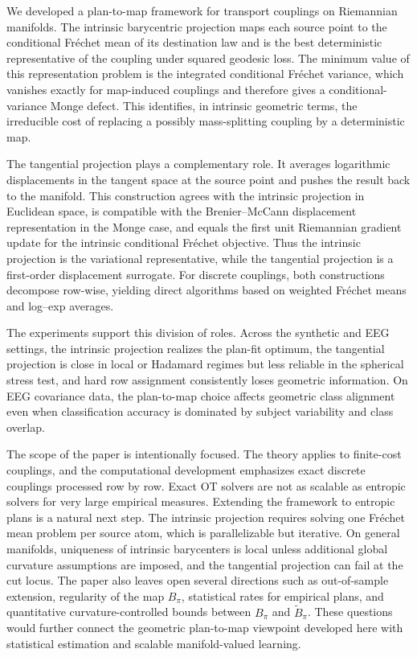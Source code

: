 \documentclass[10pt]{article} %
\theoremstyle{definition}
\providecommand{\1}{\mathbf{1}}
\begin{document}
We developed a plan-to-map framework for transport couplings on Riemannian
manifolds. The intrinsic barycentric projection maps each source point to the
conditional Fr\'echet mean of its destination law and is the best deterministic
representative of the coupling under squared geodesic loss. The minimum value
of this representation problem is the integrated conditional Fr\'echet
variance, which vanishes exactly for map-induced couplings and therefore gives
a conditional-variance Monge defect. This identifies, in intrinsic geometric
terms, the irreducible cost of replacing a possibly mass-splitting coupling by
a deterministic map.

The tangential projection plays a complementary role. It averages logarithmic
displacements in the tangent space at the source point and pushes the result
back to the manifold. This construction agrees with the intrinsic projection in
Euclidean space, is compatible with the Brenier--McCann displacement
representation in the Monge case, and equals the first unit Riemannian gradient
update for the intrinsic conditional Fr\'echet objective. Thus the intrinsic
projection is the variational representative, while the tangential
projection is a first-order displacement surrogate. For discrete couplings, both
constructions decompose row-wise, yielding direct algorithms based on weighted
Fr\'echet means and log--exp averages.

The experiments support this division of roles. Across the synthetic and EEG
settings, the intrinsic projection realizes the plan-fit optimum, the tangential
projection is close in local or Hadamard regimes but less reliable in the
spherical stress test, and hard row assignment consistently loses geometric
information. On EEG covariance data, the plan-to-map choice affects geometric
class alignment even when classification accuracy is dominated by subject
variability and class overlap.

The scope of the paper is intentionally focused. The theory applies to
finite-cost couplings, and the computational development emphasizes exact
discrete couplings processed row by row. Exact OT solvers are not as scalable
as entropic solvers for very large empirical measures. Extending the framework
to entropic plans is a natural next step. The intrinsic projection requires
solving one Fr\'echet mean problem per source atom, which is parallelizable but
iterative. On general manifolds, uniqueness of intrinsic barycenters is local
unless additional global curvature assumptions are imposed, and the tangential
projection can fail at the cut locus. The paper also leaves open several
directions such as out-of-sample extension, regularity of the map \(B_\pi\),
statistical rates for empirical plans, and quantitative curvature-controlled
bounds between \(B_\pi\) and \(\widetilde B_\pi\). These questions would further
connect the geometric plan-to-map viewpoint developed here with statistical
estimation and scalable manifold-valued learning.
\end{document}
